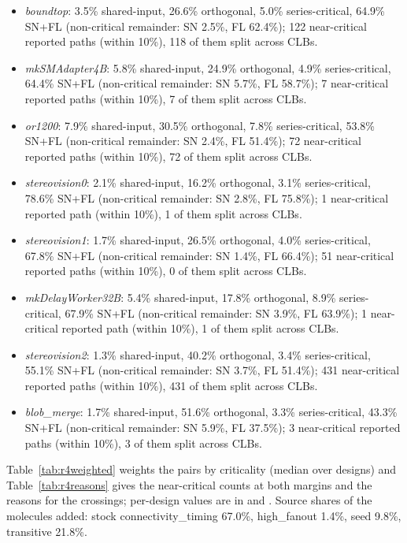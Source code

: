 \begin{itemize}
\item \emph{boundtop}: 3.5\% shared-input, 26.6\% orthogonal, 5.0\% series-critical, 64.9\% SN+FL (non-critical remainder: SN 2.5\%, FL 62.4\%); 122 near-critical reported paths (within 10\%), 118 of them split across CLBs.
\item \emph{mkSMAdapter4B}: 5.8\% shared-input, 24.9\% orthogonal, 4.9\% series-critical, 64.4\% SN+FL (non-critical remainder: SN 5.7\%, FL 58.7\%); 7 near-critical reported paths (within 10\%), 7 of them split across CLBs.
\item \emph{or1200}: 7.9\% shared-input, 30.5\% orthogonal, 7.8\% series-critical, 53.8\% SN+FL (non-critical remainder: SN 2.4\%, FL 51.4\%); 72 near-critical reported paths (within 10\%), 72 of them split across CLBs.
\item \emph{stereovision0}: 2.1\% shared-input, 16.2\% orthogonal, 3.1\% series-critical, 78.6\% SN+FL (non-critical remainder: SN 2.8\%, FL 75.8\%); 1 near-critical reported path (within 10\%), 1 of them split across CLBs.
\item \emph{stereovision1}: 1.7\% shared-input, 26.5\% orthogonal, 4.0\% series-critical, 67.8\% SN+FL (non-critical remainder: SN 1.4\%, FL 66.4\%); 51 near-critical reported paths (within 10\%), 0 of them split across CLBs.
\item \emph{mkDelayWorker32B}: 5.4\% shared-input, 17.8\% orthogonal, 8.9\% series-critical, 67.9\% SN+FL (non-critical remainder: SN 3.9\%, FL 63.9\%); 1 near-critical reported path (within 10\%), 1 of them split across CLBs.
\item \emph{stereovision2}: 1.3\% shared-input, 40.2\% orthogonal, 3.4\% series-critical, 55.1\% SN+FL (non-critical remainder: SN 3.7\%, FL 51.4\%); 431 near-critical reported paths (within 10\%), 431 of them split across CLBs.
\item \emph{blob\_merge}: 1.7\% shared-input, 51.6\% orthogonal, 3.3\% series-critical, 43.3\% SN+FL (non-critical remainder: SN 5.9\%, FL 37.5\%); 3 near-critical reported paths (within 10\%), 3 of them split across CLBs.
\end{itemize}
Table~\ref{tab:r4weighted} weights the pairs by criticality (median over designs) and Table~\ref{tab:r4reasons} gives the near-critical counts at both margins and the reasons for the crossings; per-design values are in
 and . Source shares of the molecules added: stock connectivity\_timing 67.0\%, high\_fanout 1.4\%, seed 9.8\%, transitive 21.8\%.

